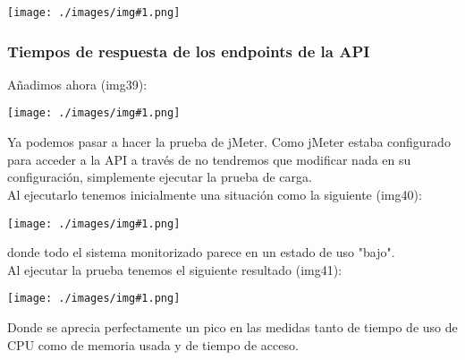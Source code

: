 \documentclass[12pt]{article}
\newcommand{\icode}[1]{\colorbox{codebg}{\texttt{\detokenize{#1}}}}
\newcommand{\img}[1] {
    \begin{center}
        \texttt{[image: ./images/img\#1.png]}
    \end{center}
}
\begin{document}
\img{38}

\subsubsection{Tiempos de respuesta de los endpoints de la API}

Añadimos ahora (img39):


\img{39}

Ya podemos pasar a hacer la prueba de jMeter. Como jMeter estaba configurado para acceder a la API a través de \icode{localhost:3000} no tendremos que modificar nada en su configuración, simplemente ejecutar la prueba de carga.\\

Al ejecutarlo tenemos inicialmente una situación como la siguiente (img40):

\img{40}

donde todo el sistema monitorizado parece en un estado de uso "bajo".\\

Al ejecutar la prueba tenemos el siguiente resultado (img41):

\img{41}

Donde se aprecia perfectamente un pico en las medidas tanto de tiempo de uso de CPU como de memoria usada y de tiempo de acceso.
\end{document}
